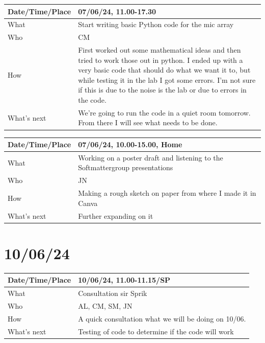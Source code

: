\documentclass{article}
\begin{document}
\begin{table}[H]
\begin{tabular}{|p{1.5in}|p{4in}|}
\hline
Date/Time/Place & 07/06/24, 11.00-17.30 \\ \hline
What            & Start writing basic Python code for the mic array\\ \hline
Who             & CM \\ \hline
How             & First worked out some mathematical ideas and then tried to work those out in python. I ended up with a very basic code that should do what we want it to, but while testing it in the lab I got some errors. I'm not sure if this is due to the noise is the lab or due to errors in the code.\\ \hline
What's next     & We're going to run the code in a quiet room tomorrow. From there I will see what needs to be done.\\ \hline
\end{tabular}
\end{table}

\begin{table}[H]
\begin{tabular}{|p{1.5in}|p{4in}|}
\hline
Date/Time/Place & 07/06/24, 10.00-15.00, Home \\ \hline
What            & Working on a poster draft and listening to the Softmattergroup presentations \\ \hline
Who             & JN \\ \hline
How             & Making a rough sketch on paper from where I made it in Canva  \\ \hline
What's next     & Further expanding on it \\ \hline
\end{tabular}
\end{table}

\section{10/06/24}

\begin{table}[H]
\begin{tabular}{|p{1.5in}|p{4in}|}
\hline
Date/Time/Place &  10/06/24, 11.00-11.15/SP\\ \hline
What            &  Consultation sir Sprik\\ \hline
Who             &  AL, CM, SM, JN\\ \hline
How             &  A quick consultation what we will be doing on 10/06.  \\ \hline
What's next     &  Testing of code to determine if the code will work\\ \hline
\end{tabular}
\end{table}
\end{document}
